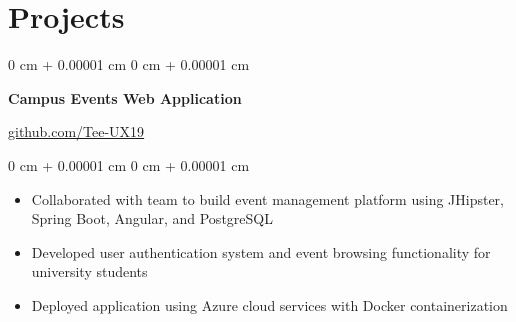 \documentclass[10pt, a4paper]{article}
\newenvironment{highlights}{
    \begin{itemize}[
        topsep=0.10 cm,
        parsep=0.10 cm,
        partopsep=0pt,
        itemsep=0pt,
        leftmargin=20pt
    ]
}{
    \end{itemize}
} %
\newenvironment{onecolentry}{
    \begin{adjustwidth}{
        0 cm + 0.00001 cm
    }{
        0 cm + 0.00001 cm
    }
}{
    \end{adjustwidth}
} %
\newenvironment{twocolentry}[2][]{
    \onecolentry
    \def\secondColumn{#2}
    \setcolumnwidth{\fill, 4.5 cm}
    \begin{paracol}{2}
}{
    \switchcolumn \raggedleft \secondColumn
    \end{paracol}
    \endonecolentry
} %
\begin{document}
    \section{Projects}




    \begin{twocolentry}{
        \href{https://github.com/Tee-UX19}{github.com/Tee-UX19}
    }
        \textbf{Campus Events Web Application}
    \end{twocolentry}

    \vspace{0.10 cm}
    \begin{onecolentry}
        \begin{highlights}
            \item Collaborated with team to build event management platform using JHipster, Spring Boot, Angular, and PostgreSQL
            \item Developed user authentication system and event browsing functionality for university students
            \item Deployed application using Azure cloud services with Docker containerization
        \end{highlights}
    \end{onecolentry}

    \vspace{0.2 cm}
\end{document}
